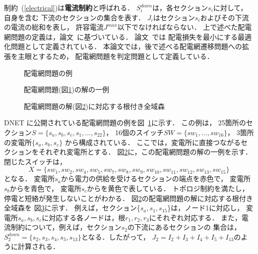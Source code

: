 制約~(\ref{electrical})は\textbf{電流制約}と呼ばれる．
$S_{i}^{down}$は，各セクション$s_{i}$に対して，自身を含む
下流のセクションの集合を表す．
$J_{i}$はセクション$s_{i}$およびその下流の電流の総和を表し，
許容電流$J^{max}$以下でなければならない．
%
上で述べた配電網問題の定義は，論文~\cite{Minato:dnet:ZDD}に基づいている．
論文~\cite{Minato:dnet:ZDD}では
配電損失を最小にする最適化問題として定義されている．
本論文では，後で述べる配電網遷移問題への拡張を主眼とするため，
配電網問題を判定問題として定義している．

\begin{figure}[tb]
 \centering
 \scalebox{0.6}{}
  \caption{配電網問題の例}
  \label{fig:test-input}
\end{figure}
%  
\begin{figure}[tb]
 \centering
 \scalebox{0.6}{}
 \caption{配電網問題(図\ref{fig:test-input})の解の一例}
 \label{fig:test-output}
\end{figure}

\begin{figure}[tbp]
  \centering
  \scalebox{0.8}{}
  \caption{配電網問題の解(図\ref{fig:test-output})に対応する根付き全域森}
  \label{fig:test-netsuki-output}
\end{figure}  

DNET
に公開されている配電網問題の例を図~\ref{fig:test-input}に示す．
この例は，
25箇所のセクション$S=\{s_{a},s_{b},s_{c},s_{1},\ldots, s_{22}\}$，
16個のスイッチ$SW=\{sw_{1},\ldots, sw_{16}\}$，
3箇所の変電所$\{s_{a}, s_{b}, s_{c}\}$
から構成されている．
ここでは，変電所に直接つながるセクションをそれぞれ変電所とする．
%
図\ref{fig:test-output}に，この配電網問題の解の一例を示す．
閉じたスイッチは，
\[X=\{sw_{1},sw_{2},sw_{4},sw_{5},sw_{7},sw_{8},sw_{9},%
sw_{10},sw_{11},sw_{12},sw_{13},sw_{15}\}\]
となる．
変電所$s_{a}$から電力の供給を受けるセクションの端点を赤色で，
変電所$s_{b}$からを青色で，
変電所$s_{c}$からを黄色で表している．
トポロジ制約を満たし，停電と短絡が発生しないことがわかる．
図\ref{fig:test-output}の配電網問題の解に対応する根付き全域森を
図\ref{fig:test-netsuki-output}に示す．
例えば，セクション\{$s_a,s_1,s_{15}$\}は，ノード1に対応し，
変電所$s_a,s_b,s_c$に対応する各ノードは，根$r_1,r_2,r_3$にそれぞれ対応する．
また，電流制約について，例えば，セクション$s_2$の下流にあるセクションの
集合は，$S_2^{down}=\{s_{2},s_{3},s_{4},s_{5},s_{13}\}$となる．したがって，
$J_{2}=I_{2}+I_{3}+I_{4}+I_{5}+I_{13}$のように計算される．


